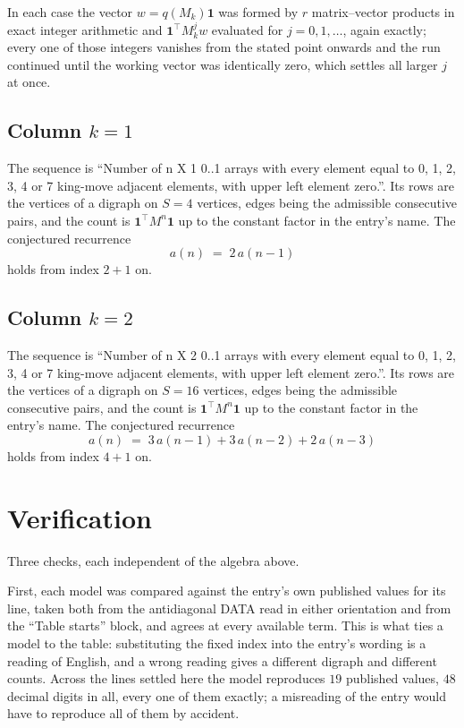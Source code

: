 \documentclass[11pt,a4paper]{article}
\theoremstyle{plain}
\theoremstyle{definition}
\begin{document}
In each case the vector $w=q(M_k)\mathbf{1}$ was formed by $r$ matrix--vector products in
exact integer arithmetic and $\mathbf{1}^{\!\top}M_k^{j}w$ evaluated for $j=0,1,\dots$,
again exactly; every one of those integers vanishes from the stated point onwards and the run
continued until the working vector was identically zero, which settles all larger $j$ at once.

\subsection*{Column $k$$=1$}
The sequence is ``Number of n X 1 0..1 arrays with every element equal to 0, 1, 2, 3, 4 or 7 king-move adjacent elements, with upper left element zero.''. Its rows are the vertices of a digraph on
$S=4$ vertices, edges being the admissible consecutive pairs, and the count is
$\mathbf{1}^{\!\top}M^{n}\mathbf{1}$ up to the constant factor in the entry's name.
The conjectured recurrence
\[
a(n)\;=\;2\,a(n-1)
\]
holds from index $2+1$ on.

\subsection*{Column $k$$=2$}
The sequence is ``Number of n X 2 0..1 arrays with every element equal to 0, 1, 2, 3, 4 or 7 king-move adjacent elements, with upper left element zero.''. Its rows are the vertices of a digraph on
$S=16$ vertices, edges being the admissible consecutive pairs, and the count is
$\mathbf{1}^{\!\top}M^{n}\mathbf{1}$ up to the constant factor in the entry's name.
The conjectured recurrence
\[
a(n)\;=\;3\,a(n-1) + 3\,a(n-2) + 2\,a(n-3)
\]
holds from index $4+1$ on.

\section{Verification}

Three checks, each independent of the algebra above.

First, each model was compared against the entry's own published values for its line, taken
both from the antidiagonal DATA read in either orientation and from the ``Table starts''
block, and agrees at every available term. This is what ties a model to the table:
substituting the fixed index into the entry's wording is a reading of English, and a wrong
reading gives a different digraph and different counts. Across the lines settled here the
model reproduces $19$ published values, $48$ decimal digits in all, every one of
them exactly; a misreading of the entry would have to reproduce all of them by accident.
\end{document}
